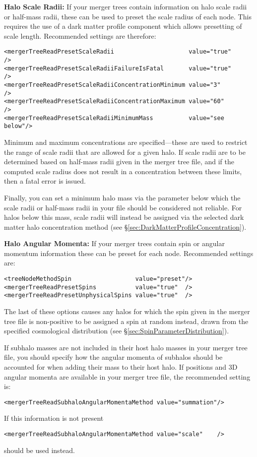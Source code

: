{\bf Halo Scale Radii:} If your merger trees contain information on halo scale radii or half-mass radii, these can be used to preset the scale radius of each \gls{node}. This requires the use of a dark matter profile component which allows presetting of scale length. Recommended settings are therefore:
\begin{verbatim}
<mergerTreeReadPresetScaleRadii                     value="true"     />
<mergerTreeReadPresetScaleRadiiFailureIsFatal       value="true"     />
<mergerTreeReadPresetScaleRadiiConcentrationMinimum value="3"        />
<mergerTreeReadPresetScaleRadiiConcentrationMaximum value="60"       />
<mergerTreeReadPresetScaleRadiiMinimumMass          value="see below"/>
\end{verbatim}
Minimum and maximum concentrations are specified---these are used to restrict the range of scale radii that are allowed for a given halo. If scale radii are to be determined based on half-mass radii given in the merger tree file, and if the computed scale radius does not result in a concentration between these limits, then a fatal error is issued.

Finally, you can set a minimum halo mass via the {\normalfont \ttfamily [mergerTreeReadPresetScaleRadiiMinimumMass]} parameter below which the scale radii or half-mass radii in your file should be considered not reliable. For halos below this mass, scale radii will instead be assigned via the selected dark matter halo concentration method (see \S\ref{sec:DarkMatterProfileConcentration}).

{\bf Halo Angular Momenta:} If your merger trees contain spin or angular momentum information these can be preset for each node. Recommended settings are:
\begin{verbatim}
<treeNodeMethodSpin                  value="preset"/>
<mergerTreeReadPresetSpins           value="true"  />
<mergerTreeReadPresetUnphysicalSpins value="true"  />
\end{verbatim}
The last of these options causes any halos for which the spin given in the merger tree file is non-positive to be assigned a spin at random instead, drawn from the specified cosmological distribution (see \S\ref{sec:SpinParameterDistribution}).

If subhalo masses are not included in their host halo masses in your merger tree file, you should specify how the angular momenta of subhalos should be accounted for when adding their mass to their host halo. If positions and 3D angular momenta are available in your merger tree file, the recommended setting is:
\begin{verbatim}
<mergerTreeReadSubhaloAngularMomentaMethod value="summation"/>
\end{verbatim}
If this information is not present 
\begin{verbatim}
<mergerTreeReadSubhaloAngularMomentaMethod value="scale"    />
\end{verbatim}
should be used instead.

